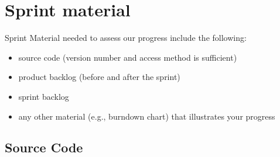 \documentclass[a4paper,11pt]{article}
\begin{document}

\section{Sprint material}
Sprint Material needed to assess our progress include the following:
\begin{itemize}
\item source code (version number and access method is sufficient)
\item product backlog (before and after the sprint)
\item sprint backlog
\item any other material (e.g., burndown chart) that illustrates your progress
\end{itemize}


\subsection{Source Code}


\end{document}
